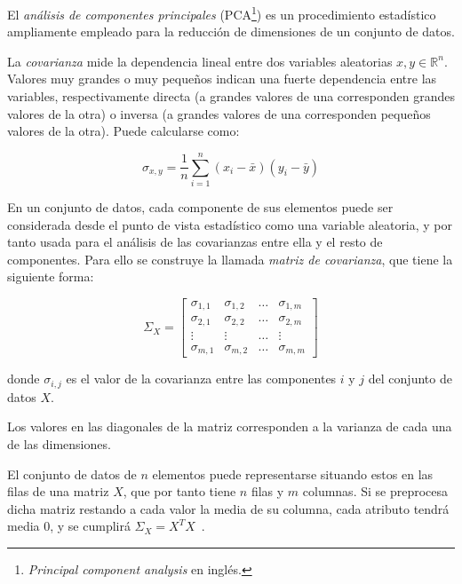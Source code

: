 El \textit{análisis de componentes principales} (PCA\footnote{\textit{Principal component analysis} en inglés.}) es un procedimiento estadístico ampliamente empleado para la reducción de dimensiones de un conjunto de datos.

La \textit{covarianza} mide la dependencia lineal entre dos variables aleatorias $x,y\in \mathbb{R}^n$.
Valores muy grandes o muy pequeños indican una fuerte dependencia entre las variables, respectivamente directa (a grandes valores de una corresponden grandes valores de la otra) o inversa (a grandes valores de una corresponden pequeños valores de la otra).
Puede calcularse como:

\begin{equation}
    \label{eq:covariance}
    \sigma_{x,y} = \frac{1}{n}\sum_{i=1}^{n}{(x_i - \bar{x})(y_i - \bar{y})}
\end{equation}

En un conjunto de datos, cada componente de sus elementos puede ser considerada desde el punto de vista estadístico como una variable aleatoria, y por tanto usada para el análisis de las covarianzas entre ella y el resto de componentes.
Para ello se construye la llamada \textit{matriz de covarianza}, que tiene la siguiente forma:

\begin{equation}
    \label{eq:covariance-matrix}
    \Sigma_X = \begin{bmatrix}
                   \sigma_{1,1} & \sigma_{1,2} & \ldots & \sigma_{1,m} \\
                   \sigma_{2,1} & \sigma_{2,2} & \ldots & \sigma_{2,m} \\
                   \vdots & \vdots & \ldots & \vdots \\
                   \sigma_{m,1} & \sigma_{m,2} & \ldots & \sigma_{m,m}
    \end{bmatrix}
\end{equation}

\noindent
donde $\sigma_{i,j}$ es el valor de la covarianza entre las componentes $i$ y $j$ del conjunto de datos $X$.

Los valores en las diagonales de la matriz corresponden a la varianza de cada una de las dimensiones.

El conjunto de datos de $n$ elementos puede representarse situando estos en las filas de una matriz $X$, que por tanto tiene $n$ filas y $m$ columnas.
Si se preprocesa dicha matriz restando a cada valor la media de su columna, cada atributo tendrá media 0, y se cumplirá $\Sigma_X = X^T X$~\cite{Tan05}.

